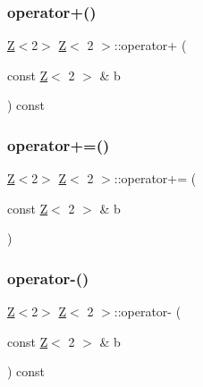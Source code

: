 \subsubsection{\texorpdfstring{operator+()}{operator+()}}
{\footnotesize\ttfamily \hyperlink{classZ}{Z}$<$2$>$ \hyperlink{classZ}{Z}$<$ 2 $>$\+::operator+ (\begin{DoxyParamCaption}\item[{const \hyperlink{classZ}{Z}$<$ 2 $>$ \&}]{b }\end{DoxyParamCaption}) const\hspace{0.3cm}{\ttfamily [inline]}}

\mbox{\label{classZ_3_012_01_4_abe24998e8f1ba064141ad5f3d04fb7e1}} 
\subsubsection{\texorpdfstring{operator+=()}{operator+=()}}
{\footnotesize\ttfamily \hyperlink{classZ}{Z}$<$2$>$ \hyperlink{classZ}{Z}$<$ 2 $>$\+::operator+= (\begin{DoxyParamCaption}\item[{const \hyperlink{classZ}{Z}$<$ 2 $>$ \&}]{b }\end{DoxyParamCaption})\hspace{0.3cm}{\ttfamily [inline]}}

\mbox{\label{classZ_3_012_01_4_a4a983a0acbe231f84fdc948c64996a55}} 
\subsubsection{\texorpdfstring{operator-\/()}{operator-()}\hspace{0.1cm}{\footnotesize\ttfamily [1/2]}}
{\footnotesize\ttfamily \hyperlink{classZ}{Z}$<$2$>$ \hyperlink{classZ}{Z}$<$ 2 $>$\+::operator-\/ (\begin{DoxyParamCaption}\item[{const \hyperlink{classZ}{Z}$<$ 2 $>$ \&}]{b }\end{DoxyParamCaption}) const\hspace{0.3cm}{\ttfamily [inline]}}

\mbox{\label{classZ_3_012_01_4_a72004bd105e0df1330f7c1f61919b9dd}} 
